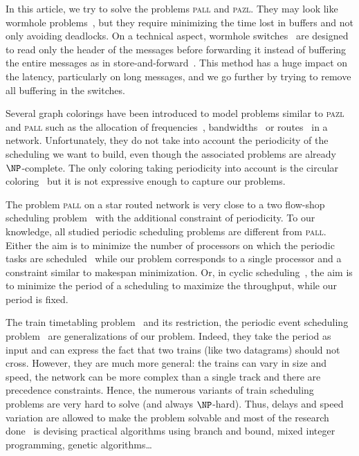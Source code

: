 \documentclass[a4paper,10pt]{journal}
\newcommand\pazl{\textsc{pazl}\xspace}
\newcommand\pall{\textsc{pall}\xspace}
\begin{document}
In this article, we try to solve the problems \pall and \pazl. They may look like wormhole problems~\cite{ni1993survey,cole1996benefit}, but they require minimizing the time lost in buffers and not only avoiding deadlocks. On a technical aspect, wormhole switches~\cite{cole1996benefit} are designed to read only the header of the messages before forwarding it instead of buffering the entire messages as in store-and-forward~\cite{tindell1992store}. This method has a huge impact on the latency, particularly on long messages, and we go further by trying to remove all buffering in the switches.

 Several graph colorings have been introduced to model problems similar to \pazl and \pall such as the allocation of frequencies~\cite{borndorfer1998frequency}, bandwidths~\cite{erlebach2001complexity} or routes~\cite{cole1996benefit} in a network. Unfortunately, they do not take into account the periodicity of the scheduling we want to build, even though the associated problems are already $\NP$-complete. The only coloring taking periodicity into account is the circular coloring~\cite{ZHU2001371,zhou2013multiple} but it is not expressive enough to capture our problems. 

The problem \pall on a star routed network is very close to a two flow-shop scheduling problem~\cite{yu2004minimizing} with the additional constraint of periodicity. To our knowledge, all studied periodic scheduling problems are different from \pall. Either the aim is to minimize the number of processors on which the periodic tasks are scheduled~\cite{korst1991periodic,hanen1993cyclic} while our problem corresponds to a single processor and a constraint similar to makespan minimization. Or, in cyclic scheduling~\cite{levner2010complexity}, the aim is to minimize the period of a scheduling to maximize the throughput, while our period is fixed. 

The train timetabling problem~\cite{lusby2011railway} and its restriction, the periodic event scheduling problem~\cite{serafini1989mathematical} are generalizations of our problem. Indeed, they take the period as input and can express the fact that two trains (like two datagrams) should not cross. However, they are much more general: the trains can vary in size and speed, the network can be more complex than a single track and there are precedence constraints. Hence, the numerous variants of train scheduling problems are very hard to solve (and always $\NP$-hard). Thus, delays and speed variation are allowed to make the problem solvable and most of the research done~\cite{lusby2011railway} is devising practical algorithms using branch and bound, mixed integer programming, genetic algorithms\dots
\end{document}
